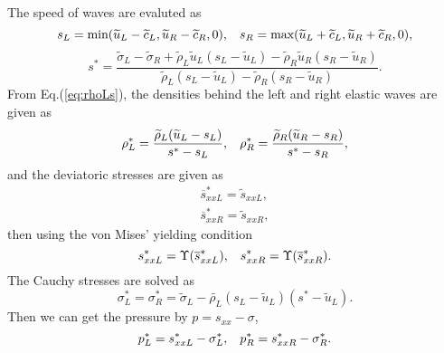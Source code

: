 \documentclass[review]{elsarticle}
\begin{document}
The speed of waves are evaluted as
\begin{equation}
  s_L = \text{min} (\widetilde{u}_L-\widetilde{c}_L, \widetilde{u}_R-\widetilde{c}_R,0), \hspace{0.3cm} s_R = \text{max}(\widetilde{u}_L+\widetilde{c}_L, \widetilde{u}_R+\widetilde{c}_R,0),
    \end{equation}
    \begin{equation}
      s^* = \frac{\widetilde{\sigma}_L-\widetilde{\sigma}_R+\widetilde{\rho}_L \widetilde{u}_L(s_L-\widetilde{u}_L)-\widetilde{\rho}_R \widetilde{u}_R(s_R-\widetilde{u}_R)}{\widetilde{\rho}_L(s_L-\widetilde{u}_L)-\widetilde{\rho}_R(s_R-\widetilde{u}_R)}.
\end{equation}
From  Eq.(\ref{eq:rhoLs}), the densities behind the left and right elastic  waves are given as
\begin{equation}
  \rho_L^* = \frac{\widetilde{\rho}_L(\widetilde{u}_L-s_L)}{s^*-s_L}, \hspace{0.3cm}  \rho_R^* = \frac{\widetilde{\rho}_R(\widetilde{u}_R-s_R)}{s^*-s_R},
\end{equation}
and the deviatoric stresses are  given as
  \begin{align}
  \overline{s}_{xxL}^* =  \widetilde{s}_{xxL},\\
  \overline{s}_{xxR}^* =  \widetilde{s}_{xxR},
\end{align}
then using  the von Mises' yielding condition
\begin{equation}
  s_{xxL}^* = \Upsilon(\overline{s}_{xxL}^*) , \hspace{0.3cm}  s_{xxR}^* = \Upsilon(\overline{s}_{xxR}^*).
\end{equation}
The Cauchy stresses  are solved as
\begin{equation}
  \sigma_L^*=\sigma_R^*=\widetilde{\sigma}_L -\widetilde{\rho_L} (s_L-\widetilde{u}_L)(s^*-\widetilde{u}_L).
\end{equation}
Then  we can get the pressure by $p =s_{xx}-\sigma$,
\begin{equation}
  p_L^* = s_{xxL}^* - \sigma_L^*, \hspace{0.3cm}   p_R^* = s_{xxR}^* - \sigma_R^*.
\end{equation}

%
\end{document}
